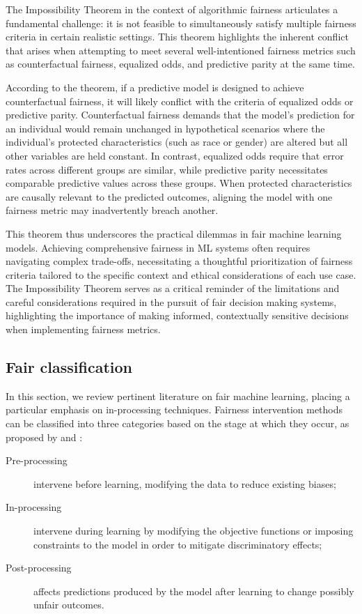 The Impossibility Theorem in the context of algorithmic fairness articulates a fundamental challenge: it is not feasible to simultaneously satisfy multiple fairness criteria in certain realistic settings. This theorem highlights the inherent conflict that arises when attempting to meet several well-intentioned fairness metrics such as counterfactual fairness, equalized odds, and predictive parity at the same time.

According to the theorem, if a predictive model is designed to achieve counterfactual fairness, it will likely conflict with the criteria of equalized odds or predictive parity. Counterfactual fairness demands that the model's prediction for an individual would remain unchanged in hypothetical scenarios where the individual's protected characteristics (such as race or gender) are altered but all other variables are held constant. In contrast, equalized odds require that error rates across different groups are similar, while predictive parity necessitates comparable predictive values across these groups. When protected characteristics are causally relevant to the predicted outcomes, aligning the model with one fairness metric may inadvertently breach another.

This theorem thus underscores the practical dilemmas in fair machine learning models. Achieving comprehensive fairness in ML systems often requires navigating complex trade-offs, necessitating a thoughtful prioritization of fairness criteria tailored to the specific context and ethical considerations of each use case. The Impossibility Theorem serves as a critical reminder of the limitations and careful considerations required in the pursuit of fair decision making systems, highlighting the importance of making informed, contextually sensitive decisions when implementing fairness metrics.

\subsection{Fair classification}

In this section, we review pertinent literature on fair machine learning, placing a particular emphasis on in-processing techniques. Fairness intervention methods can be classified into three categories based on the stage at which they occur, as proposed by \cite{Mehrabi2019} and \cite{AlerTubella2022}:

\begin{description}
    \item[Pre-processing] intervene before learning, modifying the data to reduce existing biases;
    \item[In-processing] intervene during learning by modifying the objective functions or imposing constraints to the model in order to mitigate discriminatory effects;
    \item[Post-processing] affects predictions produced by the model after learning to change possibly unfair outcomes. 
\end{description}

